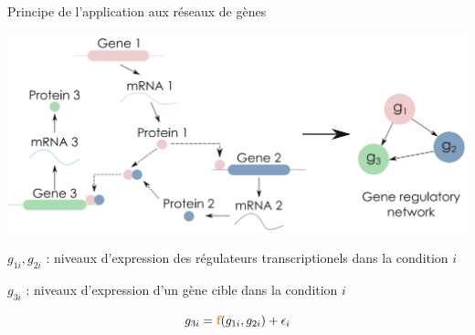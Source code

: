 	
	\begin{frame}{Principe de l'application aux réseaux de gènes}
    	\vspace{-0.4cm}
    	\begin{center}
    	    \includegraphics[scale = 0.3]{Figures/Intro/network.PNG}
    	\end{center}
    	
    	\begin{center}
    	\scriptsize 
    	$g_{1i}, g_{2i}$ : niveaux d'expression des régulateurs transcriptionels dans la condition $i$
    	
    	$g_{3i}$  : niveaux d'expression d'un gène cible dans la condition $i$
    	\end{center}
    	\vspace{-0.15cm}
    	\Large
    	\begin{equation*}
    	    g_{3i} = \textcolor{orange}{\textbf{f}}(g_{1i}, g_{2i}) + \epsilon_i
    	\end{equation*}
	\end{frame}
	
